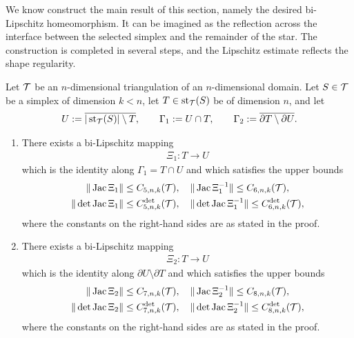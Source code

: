\documentclass[10pt,letterpaper]{article}
\begin{document}
We know construct the main result of this section, namely the desired bi-Lipschitz homeomorphism. 
It can be imagined as the reflection across the interface between the selected simplex and the remainder of the star. 
The construction is completed in several steps,
and the Lipschitz estimate reflects the shape regularity. 

\begin{theorem}\label{theorem:starreflection}
    Let ${\mathcal T}$ be an $n$-dimensional triangulation of an $n$-dimensional domain. 
    Let $S \in {\mathcal T}$ be a simplex of dimension $k < n$,
    let $T \in \operatorname{st}_{{\mathcal T}}(S)$ be of dimension $n$,
    and let 
    \begin{align*}
        U := \overline{ |\operatorname{st}_{{\mathcal T}}(S)| \setminus T },
        \qquad 
        {\Gamma_1} := U \cap T,
        \qquad 
        {\Gamma_2} := \overline{ \partial T \setminus \partial U }.
    \end{align*}
    \begin{enumerate}
    \item 
    There exists a bi-Lipschitz mapping
    \begin{align*}
        \Xi_{1} : T \rightarrow U
    \end{align*}
    which is the identity along ${\Gamma_1} = T \cap U$ and which satisfies the upper bounds 
    \begin{gather*}
        \| \operatorname{{\rm Jac}}\Xi_{1} \|          \leq C_{5,n,k}({\mathcal T}),
        \quad 
        \| \operatorname{{\rm Jac}}\Xi_{1}^{-1} \|     \leq C_{6,n,k}({\mathcal T}),
        \\
        \| \det\operatorname{{\rm Jac}}\Xi_{1} \|      \leq C^{\det}_{5,n,k}({\mathcal T}),
        \quad 
        \| \det\operatorname{{\rm Jac}}\Xi_{1}^{-1} \| \leq C^{\det}_{6,n,k}({\mathcal T}),
    \end{gather*}
    where the constants on the right-hand sides are as stated in the proof. 
    \item 
    There exists a bi-Lipschitz mapping
    \begin{align*}
        \Xi_{2} : T \rightarrow U
    \end{align*}
    which is the identity along $\partial U \setminus \partial T$ and which satisfies the upper bounds 
    \begin{gather*}
        \| \operatorname{{\rm Jac}}\Xi_{2} \|          \leq C_{7,n,k}({\mathcal T}),
        \quad 
        \| \operatorname{{\rm Jac}}\Xi_{2}^{-1} \|     \leq C_{8,n,k}({\mathcal T}),
        \\
        \| \det\operatorname{{\rm Jac}}\Xi_{2} \|      \leq C^{\det}_{7,n,k}({\mathcal T}),
        \quad 
        \| \det\operatorname{{\rm Jac}}\Xi_{2}^{-1} \| \leq C^{\det}_{8,n,k}({\mathcal T}),
    \end{gather*}
    where the constants on the right-hand sides are as stated in the proof. 
    \end{enumerate}
\end{theorem}
\end{document}
